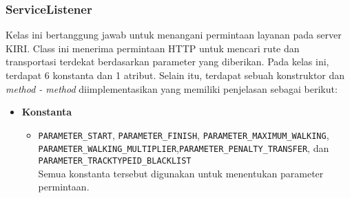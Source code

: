 \subsubsection{ServiceListener}
\label{subss:servicelistener}
Kelas ini bertanggung jawab untuk menangani permintaan layanan pada server KIRI. Class ini menerima permintaan HTTP untuk mencari rute dan transportasi terdekat berdasarkan parameter yang diberikan. Pada kelas ini, terdapat 6 konstanta dan 1 atribut. Selain itu, terdapat sebuah konstruktor dan \textit{method - method} diimplementasikan yang memiliki penjelasan sebagai berikut:
\begin{itemize}
    \item \textbf{Konstanta}
    \begin{itemize}
        \item \texttt{PARAMETER\_START}, \texttt{PARAMETER\_FINISH}, \texttt{PARAMETER\_MAXIMUM\_WALKING}, \\ \texttt{PARAMETER\_WALKING\_MULTIPLIER},\texttt{PARAMETER\_PENALTY\_TRANSFER}, dan \\ \texttt{PARAMETER\_TRACKTYPEID\_BLACKLIST}
        \\ Semua konstanta tersebut digunakan untuk menentukan parameter permintaan.
    \end{itemize}


\end{itemize}

